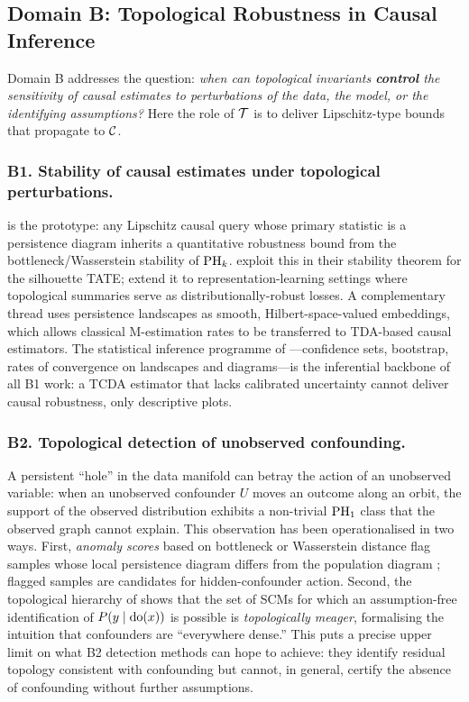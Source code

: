 \subsection{Domain B: Topological Robustness in Causal Inference}\label{sec:domain-B}

Domain B addresses the question: \emph{when can topological invariants
\textbf{control} the sensitivity of causal estimates to perturbations of
the data, the model, or the identifying assumptions?} Here the role of
$\mathcal{T}$ is to deliver Lipschitz-type bounds that propagate to $\mathcal{C}$.

\subsubsection*{B1. Stability of causal estimates under topological perturbations.}
 is the prototype: any Lipschitz causal
query whose primary statistic is a persistence diagram inherits a
quantitative robustness bound from the bottleneck/Wasserstein stability
of $\mathrm{PH}_{k}$. \citet{kim2026topological} exploit this in their stability
theorem for the silhouette TATE; \citet{farzam2025topology} extend it to
representation-learning settings where topological summaries serve as
distributionally-robust losses. A complementary thread uses persistence
landscapes \citep{bubenik2015statistical} as smooth, Hilbert-space-valued
embeddings, which allows classical M-estimation rates to be transferred
to TDA-based causal estimators. The statistical inference programme of
\citet{lecci2014statistical}---confidence sets, bootstrap, rates of
convergence on landscapes and diagrams---is the inferential backbone of
all B1 work: a TCDA estimator that lacks calibrated uncertainty cannot
deliver causal robustness, only descriptive plots.

\subsubsection*{B2. Topological detection of unobserved confounding.}
A persistent ``hole'' in the data manifold can betray the action of an
unobserved variable: when an unobserved confounder $U$ moves an outcome
along an orbit, the support of the observed distribution exhibits a
non-trivial $\mathrm{PH}_{1}$ class that the observed graph cannot explain. This
observation has been operationalised in two ways. First, \emph{anomaly
scores} based on bottleneck or Wasserstein distance flag samples whose
local persistence diagram differs from the population diagram
\citep{bruel2018topological,nigmetov2022topological}; flagged samples
are candidates for hidden-confounder action. Second, the topological
hierarchy of \citet{ibeling2021topological} shows that the set of SCMs
for which an assumption-free identification of $P(y\mid \mathrm{do}(x))$ is
possible is \emph{topologically meager}, formalising the intuition that
confounders are ``everywhere dense.'' This puts a precise upper limit on
what B2 detection methods can hope to achieve: they identify residual
topology consistent with confounding but cannot, in general, certify the
absence of confounding without further assumptions.

